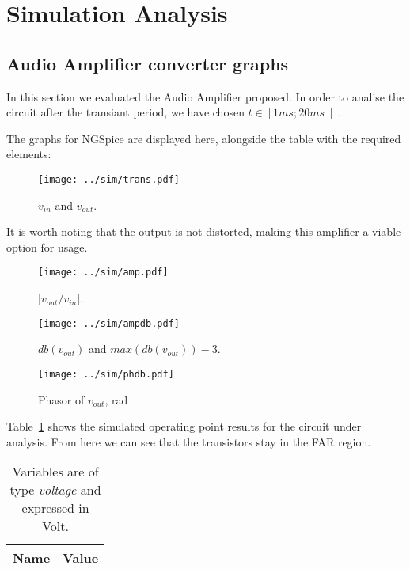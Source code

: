 \section{Simulation Analysis }
\label{sec:simulation}

\subsection{Audio Amplifier converter graphs}

In this section we evaluated the Audio Amplifier proposed.
In order to analise the circuit after the transiant period, we have chosen $t \in \left[ 1 ms; 20 ms \right[ $.

The graphs for NGSpice are displayed here, alongside the table with the required elements:

\begin{figure}[h] 
	\centering
	\vspace{-3cm}
	\texttt{[image: ../sim/trans.pdf]}
	\caption{$v_{in}$ and $v_{out}$.}
	\label{fig:SIM_TRANS}
\end{figure}

It is worth noting that the output is not distorted, making this amplifier a viable option for usage.

\begin{figure}[h] \centering
	\vspace{-3cm}
	\texttt{[image: ../sim/amp.pdf]}
	\caption{$ \left | v_{out}/v_{in} \right |$.}
\end{figure}

\newpage

\begin{figure}[h] \centering
	\vspace{-3cm}
	\texttt{[image: ../sim/ampdb.pdf]}
	\caption{$db(v_{out})$ and $max(db(v_{out}))-3$.}
\end{figure}

\begin{figure}[h] \centering
	\vspace{-3cm}
	\texttt{[image: ../sim/phdb.pdf]}
	\caption{Phasor of $v_{out}$, rad}
\end{figure}

\newpage

Table~\ref{tab:SIM_DC} shows the simulated operating point results for the circuit under analysis. From here we can see that the transistors stay in the FAR region.
\begin{table}[h]
  \centering
  \begin{tabular}{|l|r|}
    \hline    
    {\bf Name} & {\bf Value} \\ \hline
    
  \end{tabular}
  \caption{Variables are of type {\it voltage} and expressed in Volt.}
  \label{tab:SIM_DC}
\end{table}

